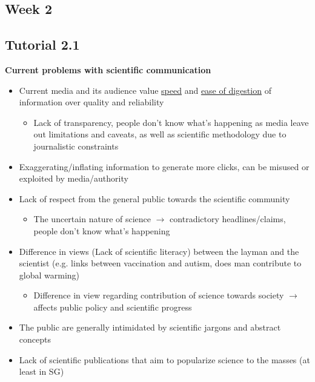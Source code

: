 \documentclass{article}
\begin{document}
\begin{multicols}{2}
\section{Week 2}
\subsection{Tutorial 2.1}
\textbf{Current problems with scientific communication}
\begin{itemize}
	\item Current media and its audience value \underline{speed} and \underline{ease of digestion} of information over quality and reliability
	\begin{itemize}
		\item Lack of transparency, people don't know what's happening as media leave out limitations and caveats, as well as scientific methodology due to journalistic constraints
	\end{itemize}
	\item Exaggerating/inflating information to generate more clicks, can be misused or exploited by media/authority
	\item Lack of respect from the general public towards the scientific community
	\begin{itemize}
		\item The uncertain nature of science $\rightarrow$ contradictory headlines/claims, people don't know what's happening
	\end{itemize}
	\item Difference in views (Lack of scientific literacy) between the layman and the scientist (e.g. links between vaccination and autism, does man contribute to global warming)
	\begin{itemize}
		\item Difference in view regarding contribution of science towards society $\rightarrow$ affects public policy and scientific progress
	\end{itemize}
	\item The public are generally intimidated by scientific jargons and abstract concepts
	\item Lack of scientific publications that aim to popularize science to the masses (at least in SG)\\
\end{itemize}


\end{multicols}
\end{document}
